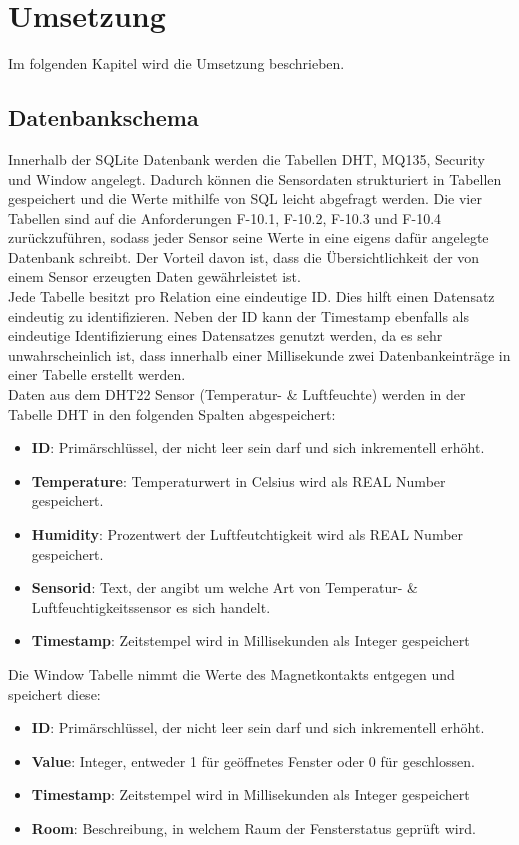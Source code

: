 \chapter{Umsetzung} \label{sec:Umsetzung}
Im folgenden Kapitel wird die Umsetzung beschrieben.

\section{Datenbankschema}\label{db:DB}
Innerhalb der SQLite Datenbank werden die Tabellen DHT, MQ135, Security und Window angelegt. Dadurch können die Sensordaten strukturiert in Tabellen gespeichert und die Werte mithilfe von \acf{SQL} leicht abgefragt werden. Die vier Tabellen sind auf die Anforderungen F-10.1, F-10.2, F-10.3 und F-10.4 zurückzuführen, sodass jeder Sensor seine Werte in eine eigens dafür angelegte Datenbank schreibt. Der Vorteil davon ist, dass die Übersichtlichkeit der von einem Sensor erzeugten Daten gewährleistet ist.\\
Jede Tabelle besitzt pro Relation eine eindeutige ID. Dies hilft einen Datensatz eindeutig zu identifizieren. Neben der ID kann der Timestamp ebenfalls als eindeutige Identifizierung eines Datensatzes genutzt werden, da es sehr unwahrscheinlich ist, dass innerhalb einer Millisekunde zwei Datenbankeinträge in einer Tabelle erstellt werden.\\

Daten aus dem DHT22 Sensor (Temperatur- \& Luftfeuchte) werden in der Tabelle DHT in den folgenden Spalten abgespeichert:
\begin{itemize}
	\item \textbf{ID}: Primärschlüssel, der nicht leer sein darf und sich inkrementell erhöht.  
	\item \textbf{Temperature}: Temperaturwert in Celsius wird als REAL Number gespeichert.
	\item \textbf{Humidity}: Prozentwert der Luftfeutchtigkeit wird als REAL Number gespeichert.
	\item \textbf{Sensorid}: Text, der angibt um welche Art von Temperatur- \& Luftfeuchtigkeitssensor es sich handelt.
	\item \textbf{Timestamp}: Zeitstempel wird in Millisekunden als Integer gespeichert
\end{itemize}

Die Window Tabelle nimmt die Werte des Magnetkontakts entgegen und speichert diese:
\begin{itemize}
	\item \textbf{ID}: Primärschlüssel, der nicht leer sein darf und sich inkrementell erhöht.  
	\item \textbf{Value}: Integer, entweder 1 für geöffnetes Fenster oder 0 für geschlossen.
	\item \textbf{Timestamp}: Zeitstempel wird in Millisekunden als Integer gespeichert
	\item \textbf{Room}: Beschreibung, in welchem Raum der Fensterstatus geprüft wird. 
\end{itemize}

